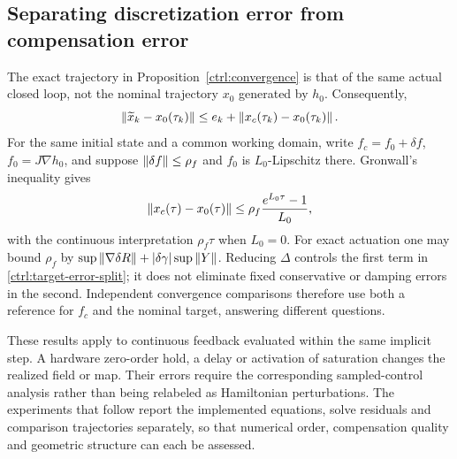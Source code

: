 \subsection{Separating discretization error from compensation error}
\label{ctrl:error-separation}

The exact trajectory in Proposition~\ref{ctrl:convergence} is that of the same actual closed loop, not the nominal trajectory $x_0$ generated by $h_0$. Consequently,
\begin{equation}\label{ctrl:target-error-split}
 \left\lVert\widetilde x_k-x_0(\tau_k)\right\rVert
 \le e_k+\left\lVert x_c(\tau_k)-x_0(\tau_k)\right\rVert.
\end{equation}
For the same initial state and a common working domain, write
$f_c=f_0+\delta f$, $f_0=J\nabla h_0$, and suppose
$\left\lVert\delta f\right\rVert\le\rho_f$ and $f_0$ is $L_0$-Lipschitz there. Gronwall's inequality gives
\[
 \left\lVert x_c(\tau)-x_0(\tau)\right\rVert
 \le \rho_f\frac{e^{L_0\tau}-1}{L_0},
\]
with the continuous interpretation $\rho_f\tau$ when $L_0=0$. For exact actuation one may bound
$\rho_f$ by $\sup\left\lVert\nabla\delta R\right\rVert+|\delta\gamma|\sup\left\lVert Y\right\rVert$.
Reducing $\Delta$ controls the first term in \eqref{ctrl:target-error-split}; it does not eliminate fixed conservative or damping errors in the second. Independent convergence comparisons therefore use both a reference for $f_c$ and the nominal target, answering different questions.

These results apply to continuous feedback evaluated within the same implicit step. A hardware zero-order hold, a delay or activation of saturation changes the realized field or map. Their errors require the corresponding sampled-control analysis rather than being relabeled as Hamiltonian perturbations. The experiments that follow report the implemented equations, solve residuals and comparison trajectories separately, so that numerical order, compensation quality and geometric structure can each be assessed.

